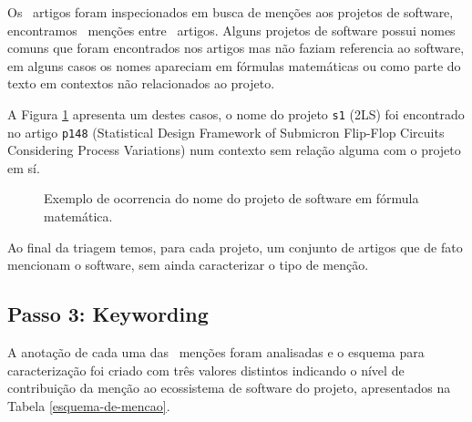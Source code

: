 Os \SearchUniqueCount \ artigos foram inspecionados em busca de menções aos
projetos de software, encontramos \ScreeningCount \ menções entre
\ScreeningUniqueCount \ artigos.
Alguns projetos de software possui nomes comuns que foram encontrados nos
artigos mas não faziam referencia ao software, em alguns casos os nomes
apareciam em fórmulas matemáticas ou como parte do texto em contextos não
relacionados ao projeto.

A Figura \ref{screenshot-paper-p148-2ls} apresenta um destes casos, o nome do
projeto \texttt{s1} (2LS) foi encontrado no artigo \texttt{p148} (Statistical
Design Framework of Submicron Flip-Flop Circuits Considering Process
Variations) num contexto sem relação alguma com o projeto em sí.

\begin{figure}[h]
  \center
  \caption{Exemplo de ocorrencia do nome do projeto de software em fórmula matemática.}
  \label{screenshot-paper-p148-2ls}
\end{figure}

Ao final da triagem temos, para cada projeto, um conjunto de artigos que de
fato mencionam o software, sem ainda caracterizar o tipo de menção.

\subsection{Passo 3: Keywording}

A anotação de cada uma das \ScreeningCount \ menções foram analisadas e o
esquema para caracterização foi criado com três valores distintos indicando o
nível de contribuição da menção ao ecossistema de software do projeto,
apresentados na Tabela \ref{esquema-de-mencao}.

